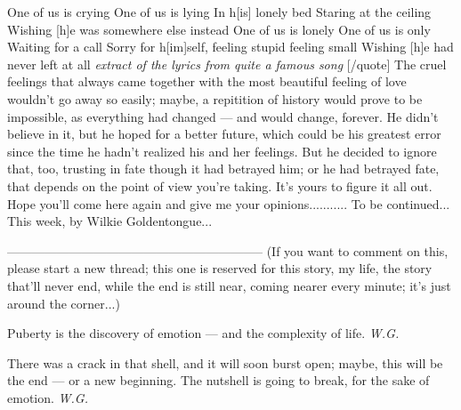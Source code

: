 One of us is crying 
One of us is lying 
In h[is] lonely bed 
Staring at the ceiling 
Wishing [h]e was somewhere else instead 
One of us is lonely 
One of us is only 
Waiting for a call 
Sorry for h[im]self, feeling stupid feeling small 
Wishing [h]e had never left at all 
\emph{extract of the lyrics from quite a famous song}
[/quote]
The cruel feelings that always came together with the most beautiful feeling of love wouldn't go away so easily; maybe, a repitition of history would prove to be impossible, as everything had changed --- and would change, forever. 
He didn't believe in it, but he hoped for a better future, which could be his greatest error since the time he hadn't realized his and her feelings. 
But he decided to ignore that, too, trusting in fate though it had betrayed him; or he had betrayed fate, that depends on the point of view you're taking. 
It's yours to figure it all out. 
Hope you'll come here again and give me your opinions...........
To be continued...
This week, by Wilkie Goldentongue...

--------------------------------------------------------------
(If you want to comment on this, please start a new thread; this one is reserved for this story, my life, the story that'll never end, while the end is still near, coming nearer every minute; it's just around the corner...)

Puberty is the discovery of emotion --- and the complexity of life. 
\emph{W.G.}

There was a crack in that shell,
and it will soon burst open;
maybe, this will be the end --- 
or a new beginning. 
The nutshell is going to break,
for the sake
of emotion. 
\emph{W.G.}
